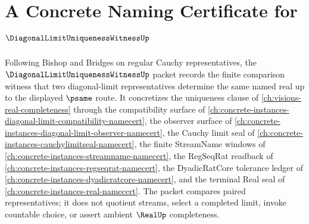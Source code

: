 \chapter{A Concrete Naming Certificate for $\DiagonalLimitUniquenessWitnessUp$}
\label{ch:concrete-instances-diagonal-limit-uniqueness-witness-namecert}

Following Bishop and Bridges on regular Cauchy representatives, the $\DiagonalLimitUniquenessWitnessUp$ packet records the finite comparison witness that two diagonal-limit representatives determine the same named real up to the displayed $\psame$ route. It concretizes the uniqueness clause of \autoref{ch:visions-real-completeness} through the compatibility surface of \autoref{ch:concrete-instances-diagonal-limit-compatibility-namecert}, the observer surface of \autoref{ch:concrete-instances-diagonal-limit-observer-namecert}, the Cauchy limit seal of \autoref{ch:concrete-instances-cauchylimitseal-namecert}, the finite StreamName windows of \autoref{ch:concrete-instances-streamname-namecert}, the RegSeqRat readback of \autoref{ch:concrete-instances-regseqrat-namecert}, the DyadicRatCore tolerance ledger of \autoref{ch:concrete-instances-dyadicratcore-namecert}, and the terminal Real seal of \autoref{ch:concrete-instances-real-namecert}. The packet compares paired representatives; it does not quotient streams, select a completed limit, invoke countable choice, or assert ambient $\RealUp$ completeness.

